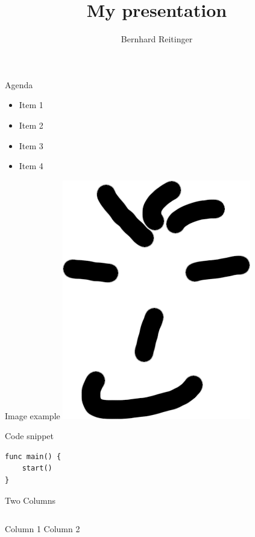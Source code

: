 \documentclass[aspectratio=43]{beamer}
\title{My presentation}
\author{Bernhard Reitinger}
\begin{document}

\maketitle

\begin{frame}{Agenda}

    \begin{itemize}
        \item Item 1
            \pause{}
        \item Item 2
        \item Item 3
        \item Item 4
    \end{itemize}

\end{frame}

\begin{frame}{Image example}
    \centering
    \includegraphics[height=0.7\textheight]{anonymous.png}
\end{frame}


\begin{frame}[fragile]{Code snippet}
    \begin{verbatim}
func main() {
    start()
}
    \end{verbatim}
\end{frame}

\begin{frame}{Two Columns}
    \begin{columns}
        \centering
        Column 1
        \centering
        Column 2
    \end{columns}
\end{frame}
\end{document}
